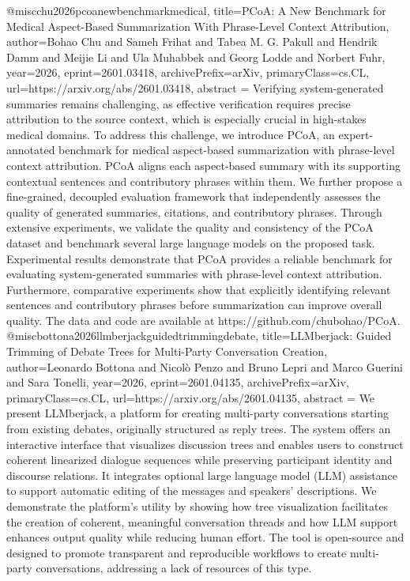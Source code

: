 {}@misc{chu2026pcoanewbenchmarkmedical,
      title={PCoA: A New Benchmark for Medical Aspect-Based Summarization With Phrase-Level Context Attribution}, 
      author={Bohao Chu and Sameh Frihat and Tabea M. G. Pakull and Hendrik Damm and Meijie Li and Ula Muhabbek and Georg Lodde and Norbert Fuhr},
      year={2026},
      eprint={2601.03418},
      archivePrefix={arXiv},
      primaryClass={cs.CL},
      url={https://arxiv.org/abs/2601.03418},
      abstract = {Verifying system-generated summaries remains challenging, as effective verification requires precise attribution to the source context, which is especially crucial in high-stakes medical domains. To address this challenge, we introduce PCoA, an expert-annotated benchmark for medical aspect-based summarization with phrase-level context attribution. PCoA aligns each aspect-based summary with its supporting contextual sentences and contributory phrases within them. We further propose a fine-grained, decoupled evaluation framework that independently assesses the quality of generated summaries, citations, and contributory phrases. Through extensive experiments, we validate the quality and consistency of the PCoA dataset and benchmark several large language models on the proposed task. Experimental results demonstrate that PCoA provides a reliable benchmark for evaluating system-generated summaries with phrase-level context attribution. Furthermore, comparative experiments show that explicitly identifying relevant sentences and contributory phrases before summarization can improve overall quality. The data and code are available at https://github.com/chubohao/PCoA.}
}@misc{bottona2026llmberjackguidedtrimmingdebate,
      title={LLMberjack: Guided Trimming of Debate Trees for Multi-Party Conversation Creation}, 
      author={Leonardo Bottona and Nicolò Penzo and Bruno Lepri and Marco Guerini and Sara Tonelli},
      year={2026},
      eprint={2601.04135},
      archivePrefix={arXiv},
      primaryClass={cs.CL},
      url={https://arxiv.org/abs/2601.04135},
      abstract = {We present LLMberjack, a platform for creating multi-party conversations starting from existing debates, originally structured as reply trees. The system offers an interactive interface that visualizes discussion trees and enables users to construct coherent linearized dialogue sequences while preserving participant identity and discourse relations. It integrates optional large language model (LLM) assistance to support automatic editing of the messages and speakers' descriptions. We demonstrate the platform's utility by showing how tree visualization facilitates the creation of coherent, meaningful conversation threads and how LLM support enhances output quality while reducing human effort. The tool is open-source and designed to promote transparent and reproducible workflows to create multi-party conversations, addressing a lack of resources of this type.}
}
